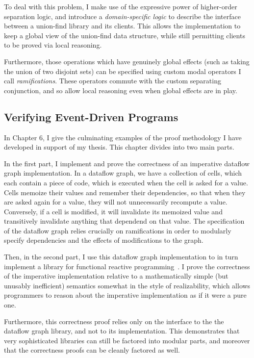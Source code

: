 To deal with this problem, I make use of the expressive power of
higher-order separation logic, and introduce a \emph{domain-specific
  logic} to describe the interface between a union-find library and
its clients. This allows the implementation to keep a global view of
the union-find data structure, while still permitting clients to be
proved via local reasoning.

Furthermore, those operations which have genuinely global effects
(such as taking the union of two disjoint sets) can be specified using
custom modal operators I call \emph{ramifications}. These operators
commute with the custom separating conjunction, and so allow local
reasoning even when global effects are in play.

\subsection{Verifying Event-Driven Programs}

In Chapter 6, I give the culminating examples of the proof methodology
I have developed in support of my thesis. This chapter divides into 
two main parts. 

In the first part, I implement and prove the correctness of an
imperative dataflow graph implementation. In a dataflow graph, we have
a collection of cells, which each contain a piece of code, which is
executed when the cell is asked for a value. Cells memoize their
values and remember their dependencies, so that when they are asked
again for a value, they will not unnecessarily recompute a
value. Conversely, if a cell is modified, it will invalidate its
memoized value and transitively invalidate anything that dependend on
that value.  The specification of the dataflow graph relies crucially
on ramifications in order to modularly specify dependencies and the
effects of modifications to the graph.

Then, in the second part, I use this dataflow graph implementation to
in turn implement a library for functional reactive
programming~\cite{frp}. I prove the correctness of the imperative
implementation relative to a mathematically simple (but unusably
inefficient) semantics somewhat in the style of realizability, which
allows programmers to reason about the imperative implementation as if
it were a pure one. 

Furthermore, this correctness proof relies only on the interface to
the the dataflow graph library, and not to its implementation. This
demonstrates that very sophisticated libraries can still be factored
into modular parts, and moreover that the correctness proofs can be
cleanly factored as well. 

